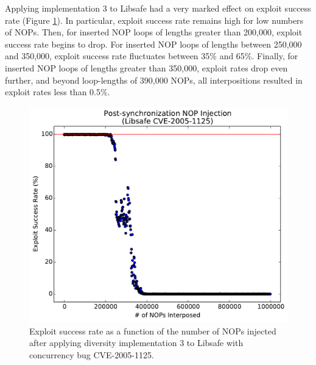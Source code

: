 Applying implementation 3 to Libsafe had a very marked effect on exploit success rate (Figure \ref{fig_libsafe-post}).
In particular, exploit success rate remains high for low numbers of NOPs.
Then, for inserted NOP loops of lengths greater than 200,000, exploit success rate begins to drop.
For inserted NOP loops of lengths between 250,000 and 350,000, exploit success rate fluctuates between 35\% and 65\%.
Finally, for inserted NOP loops of lengths greater than 350,000, exploit rates drop even further, and beyond loop-lengths of 390,000 NOPs, all interpositions resulted in exploit rates less than 0.5\%.
\begin{figure}
	\centering
	\includegraphics[width=\columnwidth]{figures/libsafe-post}
	\caption{Exploit success rate as a function of the number of NOPs injected after applying diversity implementation 3 to Libsafe with concurrency bug CVE-2005-1125.}
	\label{fig_libsafe-post}
\end{figure}

